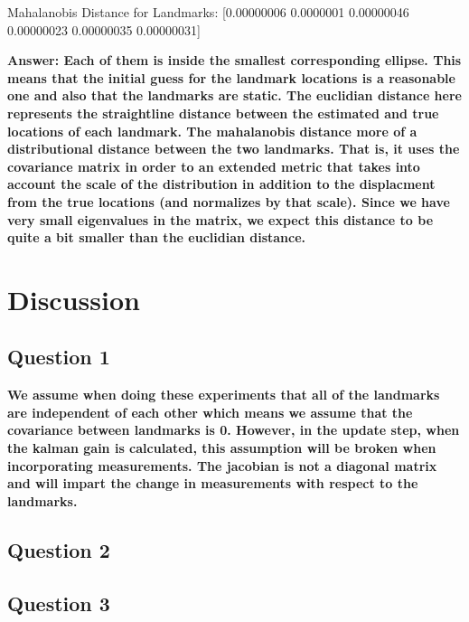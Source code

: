 \documentclass[12pt, a4paper]{article}
\begin{document}
Mahalanobis Distance for Landmarks: [0.00000006 0.0000001  0.00000046 0.00000023 0.00000035 0.00000031]



\textbf{Answer: Each of them is inside the smallest corresponding ellipse. This means that the initial guess for the landmark locations is a reasonable one and also that the landmarks are static. The euclidian distance here represents the straightline distance between the estimated and true locations of each landmark. The mahalanobis distance more of a distributional distance between the two landmarks. That is, it uses the covariance matrix in order to an extended metric that takes into account the scale of the distribution in addition to the displacment from the true locations (and normalizes by that scale). Since we have very small eigenvalues in the matrix, we expect this distance to be quite a bit smaller than the euclidian distance.}

\clearpage
\section{Discussion}
\subsection*{Question 1}
\textbf{We assume when doing these experiments that all of the landmarks are independent of each other which means we assume that the covariance between landmarks is 0. However, in the update step, when the kalman gain is calculated, this assumption will be broken when incorporating measurements. The jacobian is not a diagonal matrix and will impart the change in measurements with respect to the landmarks.}
\subsection*{Question 2}
\subsection*{Question 3}
\end{document}
